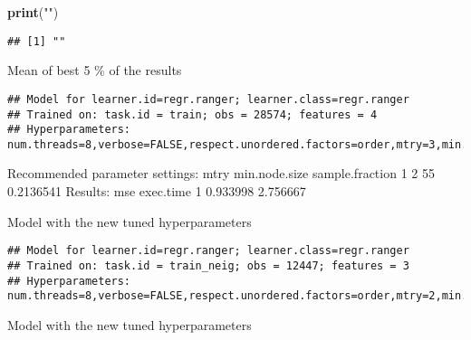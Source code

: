 \documentclass[
]{article}
\newenvironment{Shaded}{\begin{snugshade}}{\end{snugshade}}
\newcommand{\KeywordTok}[1]{\textcolor[rgb]{0.13,0.29,0.53}{\textbf{#1}}}
\newcommand{\NormalTok}[1]{#1}
\newcommand{\OperatorTok}[1]{\textcolor[rgb]{0.81,0.36,0.00}{\textbf{#1}}}
\newcommand{\StringTok}[1]{\textcolor[rgb]{0.31,0.60,0.02}{#1}}
\begin{document}
\begin{Shaded}
\begin{Highlighting}[]
\KeywordTok{print}\NormalTok{(}\StringTok{""}\NormalTok{)  }
\end{Highlighting}
\end{Shaded}

\begin{verbatim}
## [1] ""
\end{verbatim}

Mean of best 5 \% of the results

\begin{Shaded}
\end{Shaded}

\begin{verbatim}
## Model for learner.id=regr.ranger; learner.class=regr.ranger
## Trained on: task.id = train; obs = 28574; features = 4
## Hyperparameters: num.threads=8,verbose=FALSE,respect.unordered.factors=order,mtry=3,min.node.size=26,sample.fraction=0.204,num.trees=1e+03,replace=FALSE
\end{verbatim}

Recommended parameter settings: mtry min.node.size sample.fraction 1 2
55 0.2136541 Results: mse exec.time 1 0.933998 2.756667

Model with the new tuned hyperparameters

\begin{Shaded}
\end{Shaded}

\begin{verbatim}
## Model for learner.id=regr.ranger; learner.class=regr.ranger
## Trained on: task.id = train_neig; obs = 12447; features = 3
## Hyperparameters: num.threads=8,verbose=FALSE,respect.unordered.factors=order,mtry=2,min.node.size=16,sample.fraction=0.206,num.trees=1e+03,replace=FALSE
\end{verbatim}

Model with the new tuned hyperparameters

\begin{Shaded}
\end{Shaded}
\end{document}
